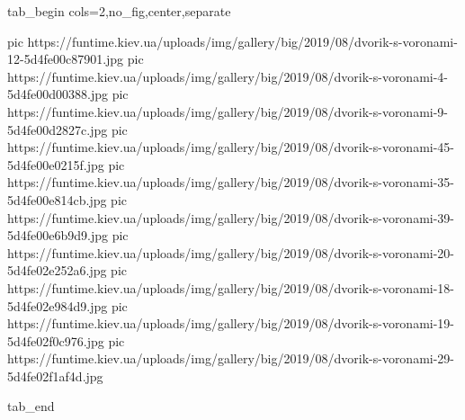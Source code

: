  
 
 
 
 


\ifcmt
  tab_begin cols=2,no_fig,center,separate

     pic https://funtime.kiev.ua/uploads/img/gallery/big/2019/08/dvorik-s-voronami-12-5d4fe00c87901.jpg
		 pic https://funtime.kiev.ua/uploads/img/gallery/big/2019/08/dvorik-s-voronami-4-5d4fe00d00388.jpg
		 pic https://funtime.kiev.ua/uploads/img/gallery/big/2019/08/dvorik-s-voronami-9-5d4fe00d2827c.jpg
		 pic https://funtime.kiev.ua/uploads/img/gallery/big/2019/08/dvorik-s-voronami-45-5d4fe00e0215f.jpg
		 pic https://funtime.kiev.ua/uploads/img/gallery/big/2019/08/dvorik-s-voronami-35-5d4fe00e814cb.jpg
		 pic https://funtime.kiev.ua/uploads/img/gallery/big/2019/08/dvorik-s-voronami-39-5d4fe00e6b9d9.jpg
		 pic https://funtime.kiev.ua/uploads/img/gallery/big/2019/08/dvorik-s-voronami-20-5d4fe02e252a6.jpg
		 pic https://funtime.kiev.ua/uploads/img/gallery/big/2019/08/dvorik-s-voronami-18-5d4fe02e984d9.jpg
		 pic https://funtime.kiev.ua/uploads/img/gallery/big/2019/08/dvorik-s-voronami-19-5d4fe02f0c976.jpg
		 pic https://funtime.kiev.ua/uploads/img/gallery/big/2019/08/dvorik-s-voronami-29-5d4fe02f1af4d.jpg

  tab_end
\fi
